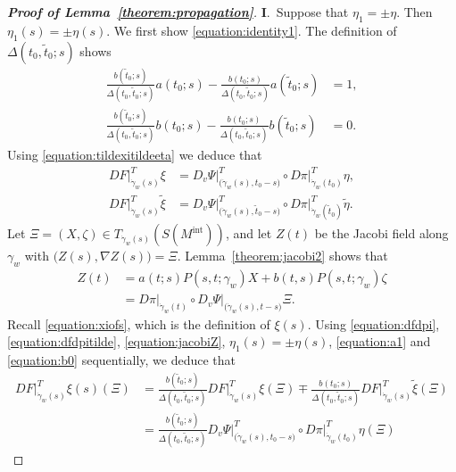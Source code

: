 \documentclass[a4paper,11pt,reqno]{amsart}
\numberwithin{equation}{section}
\theoremstyle{definition}
\theoremstyle{remark}
\begin{document}
\begin{proof}[{\bf Proof of Lemma~\ref{theorem:propagation}}]
{\bf I}.\ 
Suppose that $\eta_1=\pm\eta$. Then $\eta_1(s)=\pm\eta(s)$. 
We first show \eqref{equation:identity1}. 
The definition of $\Delta(t_0,\tilde{t}_0;s)$ shows 
%
%
\begin{align}
\frac{b(\tilde{t}_0;s)}{\Delta(t_0,\tilde{t}_0;s)}
a(t_0;s)
-
\frac{b(t_0;s)}{\Delta(t_0,\tilde{t}_0;s)}
a(\tilde{t}_0;s)
& = 1,
\label{equation:a1}
\\
\frac{b(\tilde{t}_0;s)}{\Delta(t_0,\tilde{t}_0;s)}
b(t_0;s)
-
\frac{b(t_0;s)}{\Delta(t_0,\tilde{t}_0;s)}
b(\tilde{t}_0;s)
& = 0. 
\label{equation:b0}
\end{align}
%
%
Using \eqref{equation:tildexitildeeta} we deduce that 
%
%
\begin{align}
  DF\vert^T_{\dot{\gamma}_w(s)}\xi
& =
  D_v\Psi\vert^T_{\bigl(\dot{\gamma}_w(s),t_0-s\bigr)}
  \circ
  D\pi\vert^T_{\dot{\gamma}_w(t_0)}\eta,
\label{equation:dfdpi}
\\
  DF\vert^T_{\dot{\gamma}_w(s)}\tilde{\xi}
& =
  D_v\Psi\vert^T_{\bigl(\dot{\gamma}_w(s),\tilde{t}_0-s\bigr)}
  \circ
  D\pi\vert^T_{\dot{\gamma}_w(\tilde{t}_0)}\tilde{\eta}.
\label{equation:dfdpitilde} 
\end{align}
%
%
Let $\Xi=(X,\zeta) \in T_{\dot{\gamma}_w(s)}(S(M^\text{int}))$, 
and let $Z(t)$ be the Jacobi field along $\gamma_w$ with 
$\bigl(Z(s),{\nabla}Z(s)\bigr)=\Xi$. 
Lemma~\ref{theorem:jacobi2} shows that 
%
%
\begin{align}
  Z(t)
& =
  a(t;s)P(s,t;\gamma_w)X
  +
  b(t,s)P(s,t;\gamma_w)\zeta
\nonumber
\\
& =
  D\pi\vert_{\dot{\gamma}_w(t)}
  \circ
  D_v\Psi\vert_{\bigl(\dot{\gamma}_w(s),t-s\bigr)}
  \Xi. 
\label{equation:jacobiZ}
\end{align}
%
%
Recall \eqref{equation:xiofs}, which is the definition of $\xi(s)$. 
Using 
\eqref{equation:dfdpi}, 
\eqref{equation:dfdpitilde}, 
\eqref{equation:jacobiZ}, 
$\eta_1(s)=\pm\eta(s)$, 
\eqref{equation:a1} 
and 
\eqref{equation:b0} 
sequentially,  
we deduce that
%
%
\begin{align*}
  DF\vert^T_{\dot{\gamma}_w(s)}\xi(s)(\Xi)
& =
  \frac{b(\tilde{t}_0;s)}{\Delta(t_0,\tilde{t}_0;s)}
  DF\vert^T_{\dot{\gamma}_w(s)}\xi(\Xi)
  \mp
  \frac{b(t_0;s)}{\Delta(t_0,\tilde{t}_0;s)}
  DF\vert^T_{\dot{\gamma}_w(s)}\tilde{\xi}(\Xi)
\\
& =
  \frac{b(\tilde{t}_0;s)}{\Delta(t_0,\tilde{t}_0;s)}
  D_v\Psi\vert^T_{\bigl(\dot{\gamma}_w(s),t_0-s\bigr)}
  \circ
  D\pi\vert^T_{\dot{\gamma}_w(t_0)}\eta(\Xi)

\end{align*}
\end{proof}
\end{document}
